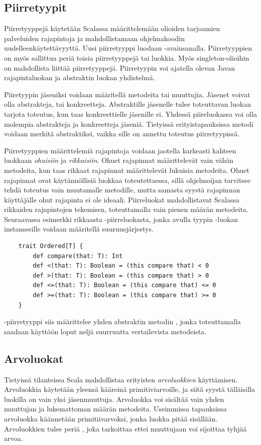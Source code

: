 \subsection{Piirretyypit} \label{piirretyypit}
Piirretyyppejä käytetään Scalassa määrittelemään olioiden tarjoamien palveluiden rajapintoja ja mahdollistamaan ohjelmakoodin uudelleenkäytettävyyttä. Uusi piirretyyppi luodaan -avainsanalla. Piirretyyppien on myös sallittua periä toisia piirretyyppejä tai luokkia. Myös singleton-olioihin on mahdollista liittää piirretyyppejä. Piirretyypin voi ajatella olevan Javan rajapintaluokan ja abstraktin luokan yhdistelmä.
\cite[Luku 6 ja 12]{prorgrammingInScala3rd}

Piiretyypin jäseniksi voidaan määritellä metodeita tai muuttujia. Jäsenet voivat olla abstrakteja, tai konkreetteja. Abstraktille jäsenelle tulee toteuttavan luokan tarjota toteutus, kun taas konkreettielle jäsenille ei. Yhdessä piireluokassa voi olla molempia abstrakteja ja konkreetteja jäseniä. Tietyissä erityistapauksissa metodi voidaan merkitä abstraktiksi, vaikka sille on annettu toteutus piirretyypissä.
\cite[Luku 10]{scalaForTheImpatient}

Piirretyyppien määrittelemiä rajapintoja voidaan jaotella karkeasti kahteen luokkaan \textit{ohuisiin} ja \textit{rikkaisiin}. Ohuet rajapinnat määrittelevät vain vähän metodeita, kun taas rikkaat rajapinnat määrittelevät lukuisia metodeita. Ohuet rajapinnat ovat käytännöllisiä luokkaa toteutettaessa, sillä ohjelmoijan tarvitsee tehdä toteutus vain muutamalle metodille, mutta samasta syystä rajapinnan käyttäjälle ohut rajapinta ei ole ideaali. Piirreluokat mahdollistavat Scalassa rikkaiden rajapintojen tekemisen, toteuttamalla vain pienen määrän metodeita. Seuraavassa esimerkki rikkaasta -piirreluokasta, jonka avulla tyypin -luokan instansseille voidaan määritellä suuruusjärjestys.
\begin{lstlisting}
    trait Ordered[T] {
        def compare(that: T): Int
        def <(that: T): Boolean = (this compare that) < 0
        def >(that: T): Boolean = (this compare that) > 0
        def <=(that: T): Boolean = (this compare that) <= 0
        def >=(that: T): Boolean = (this compare that) >= 0
    }
\end{lstlisting}
-piirretyyppi siis määrittelee yhden abstraktin metodin , jonka toteuttamalla saadaan käyttöön loput neljä suurruutta vertailevista metodeista. 
\cite[Luku 12]{prorgrammingInScala3rd}


\subsection{Arvoluokat} \label{arvoluokat}
Tietyissä tilanteissa Scala mahdollistaa erityisten \textit{arvoluokkien} käyttämisen. Arvoluokkia käytetään yleensä kääreinä primitiviarvoille, ja siitä syystä tälläisilla luokilla on vain yksi jäsenmuuttuja. Arvoluokka voi sisältää vain yhden muuttujan ja lukemattoman määrän metodeita. Useimmissa tapauksissa arvoluokka käännetään primitiivarvoksi, jonka luokka pitää sisällään. Arvoluokkien tulee periä , joka tarkoittaa ettei muuttujaan voi sijoittaa tyhjää arvoa.

